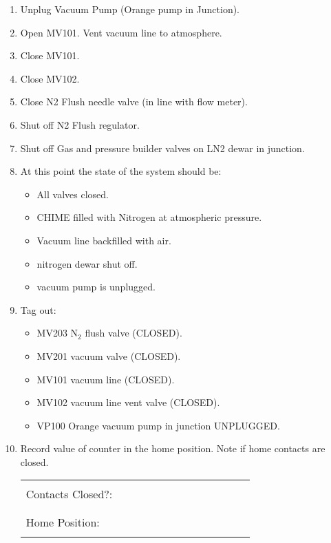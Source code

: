 \begin{enumerate}
\item\checkbox Unplug Vacuum Pump (Orange pump in Junction).
  
\item\checkbox Open MV101.  Vent vacuum line to atmosphere.
  
\item\checkbox Close MV101.
  
\item\checkbox Close MV102.

\item\checkbox Close N2 Flush needle valve (in line with flow meter).
  
\item\checkbox Shut off N2 Flush regulator.
  
\item\checkbox Shut off Gas and pressure builder valves on LN2 dewar in junction.
  
\item\checkbox At this point the state of the system should be:
  \begin{itemize}
  \item All valves closed.
  \item CHIME filled with Nitrogen at atmospheric pressure.
  \item Vacuum line backfilled with air.
  \item nitrogen dewar shut off.
  \item vacuum pump is unplugged.
  \end{itemize}

\item\checkbox Tag out:
  \begin{itemize}
  \item\checkbox MV203 N$_2$ flush valve (CLOSED).
  \item\checkbox MV201 vacuum valve (CLOSED).
  \item\checkbox MV101 vacuum line (CLOSED).
  \item\checkbox MV102 vacuum line vent valve (CLOSED).
  \item\checkbox VP100 Orange vacuum pump in junction UNPLUGGED.
  \end{itemize}

\item\checkbox Record value of counter in the home position. 
  Note if home contacts
   are closed.
     \begin{center}
     \begin{tabular}{|l|}
     \hline
      \\
     Contacts Closed?:~~~~~~~~~~~~~~~~~~~~~~~~\\
      \\
     \hline
      \\
     Home Position:~~~~~~~~~~~~~~~~~~~~~~~~\\
      \\
     \hline
     \end{tabular}
     \end{center}


\end{enumerate}
